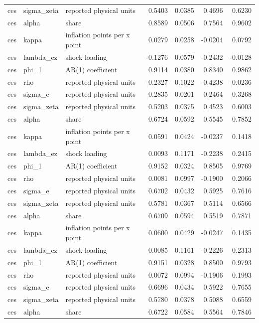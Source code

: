 \begin{tabular}{lllrrrr}
ces & sigma\_zeta & reported physical units & 0.5403 & 0.0385 & 0.4696 & 0.6230 \\
ces & alpha & share & 0.8589 & 0.0506 & 0.7564 & 0.9602 \\
ces & kappa & inflation points per x point & 0.0279 & 0.0258 & -0.0204 & 0.0792 \\
ces & lambda\_ez & shock loading & -0.1276 & 0.0579 & -0.2432 & -0.0128 \\
ces & phi\_1 & AR(1) coefficient & 0.9114 & 0.0380 & 0.8340 & 0.9862 \\
ces & rho & reported physical units & -0.2327 & 0.1022 & -0.4238 & -0.0236 \\
ces & sigma\_e & reported physical units & 0.2835 & 0.0201 & 0.2464 & 0.3268 \\
ces & sigma\_zeta & reported physical units & 0.5203 & 0.0375 & 0.4523 & 0.6003 \\
ces & alpha & share & 0.6724 & 0.0592 & 0.5545 & 0.7852 \\
ces & kappa & inflation points per x point & 0.0591 & 0.0424 & -0.0237 & 0.1418 \\
ces & lambda\_ez & shock loading & 0.0093 & 0.1171 & -0.2238 & 0.2415 \\
ces & phi\_1 & AR(1) coefficient & 0.9152 & 0.0324 & 0.8505 & 0.9769 \\
ces & rho & reported physical units & 0.0081 & 0.0997 & -0.1900 & 0.2066 \\
ces & sigma\_e & reported physical units & 0.6702 & 0.0432 & 0.5925 & 0.7616 \\
ces & sigma\_zeta & reported physical units & 0.5781 & 0.0367 & 0.5114 & 0.6566 \\
ces & alpha & share & 0.6709 & 0.0594 & 0.5519 & 0.7871 \\
ces & kappa & inflation points per x point & 0.0600 & 0.0429 & -0.0247 & 0.1435 \\
ces & lambda\_ez & shock loading & 0.0085 & 0.1161 & -0.2226 & 0.2313 \\
ces & phi\_1 & AR(1) coefficient & 0.9151 & 0.0328 & 0.8500 & 0.9793 \\
ces & rho & reported physical units & 0.0072 & 0.0994 & -0.1906 & 0.1993 \\
ces & sigma\_e & reported physical units & 0.6696 & 0.0434 & 0.5922 & 0.7655 \\
ces & sigma\_zeta & reported physical units & 0.5780 & 0.0378 & 0.5088 & 0.6559 \\
ces & alpha & share & 0.6722 & 0.0584 & 0.5564 & 0.7846 \\

\end{tabular}
